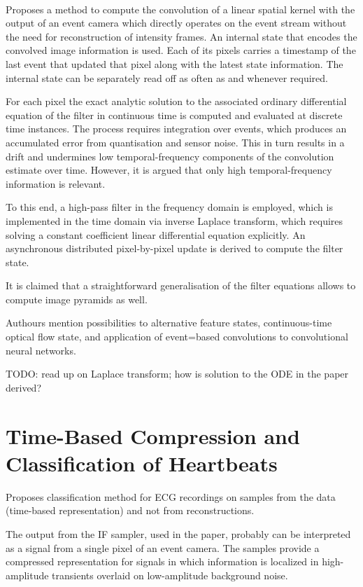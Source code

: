 \documentclass[10pt,a4paper]{article}
\begin{document}
\paragraph{}
Proposes a method to compute the convolution of a linear spatial kernel with the output of an event camera which directly operates on the event stream without the need for reconstruction of intensity frames.
An internal state that encodes the convolved image information is used. Each of its pixels carries a timestamp of the last event that updated that pixel along with the latest state information.
The internal state can be separately read off as often as and whenever required.

For each pixel the exact analytic solution to the associated ordinary differential equation of the filter in continuous time is computed and evaluated at discrete time instances.
The process requires integration over events, which produces an accumulated error from quantisation and sensor noise.
This in turn results in a drift and undermines low temporal-frequency components of the convolution estimate over time.
However, it is argued that only high temporal-frequency information is relevant.

To this end, a high-pass filter in the frequency domain is employed, which is implemented in the time domain via inverse Laplace transform, which requires solving a constant coefficient linear differential equation explicitly.
An asynchronous distributed pixel-by-pixel update is derived to compute the filter state.

It is claimed that a straightforward generalisation of the filter equations allows to compute image pyramids as well.

Authours mention possibilities to alternative feature states, continuous-time optical flow state, and application of event=based convolutions to convolutional neural networks.

TODO: read up on Laplace transform; how is solution to the ODE in the paper derived?

\section{Time-Based Compression and Classification of Heartbeats}
Proposes classification method for ECG recordings on samples from the data (time-based representation) and not from reconstructions.

The output from the IF sampler, used in the paper, probably can be interpreted as a signal from a single pixel of an event camera.
The samples provide a compressed representation for signals in which information is localized in high-amplitude transients overlaid on low-amplitude background noise.
\end{document}
